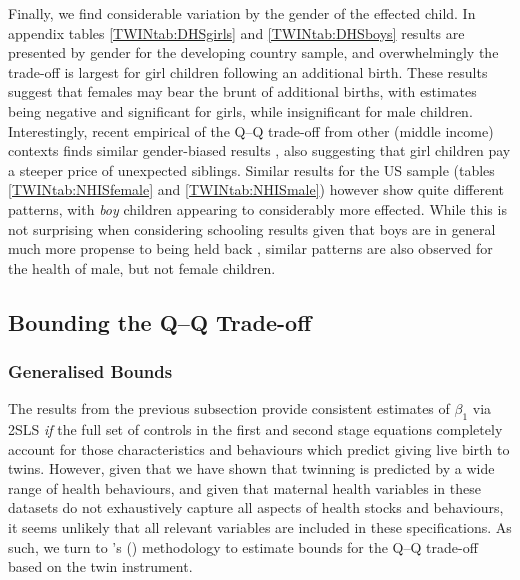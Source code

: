 \documentclass[subeqn]{article}
\begin{document}
\begin{spacing}{1.4}
Finally, we find considerable variation by the gender of the effected child.
In appendix tables \ref{TWINtab:DHSgirls} and \ref{TWINtab:DHSboys} results are
presented by gender for the developing country sample, and overwhelmingly the
trade-off is largest for girl children following an additional birth.  These
results suggest that females may bear the brunt of additional births, with
estimates being negative and significant for girls, while insignificant for male
children. Interestingly, recent empirical of the Q--Q trade-off from other (middle
income) contexts finds similar gender-biased results \citep{SouzaPonczek2012},
also suggesting that girl children pay a steeper price of unexpected siblings.
Similar results for the US sample (tables \ref{TWINtab:NHISfemale} and
\ref{TWINtab:NHISmale}) however show quite different patterns, with \emph{boy}
children appearing to considerably more effected. While this is not surprising
when considering schooling results given that boys are in general much more
propense to being held back \citet{Warrenetal2014}, similar patterns are also
observed for the health of male, but not female children.

\subsection{Bounding the Q--Q Trade-off}           \label{TWINsscn:resultBounds}
\subsubsection{Generalised Bounds}
The results from the previous subsection provide consistent estimates of 
$\beta_1$ via 2SLS \emph{if} the full set of controls in the first and second 
stage equations completely account for those characteristics and behaviours 
which predict giving live birth to twins. However, given that we have shown that 
twinning is predicted by a wide range of health behaviours, and given that 
maternal health variables in these datasets do not exhaustively capture all 
aspects of health stocks and behaviours, it seems unlikely that all relevant 
variables are included in these specifications. As such, we turn to 
\citeauthor{Conleyetal2012}'s (\citeyear{Conleyetal2012}) methodology to
estimate bounds for the Q--Q trade-off based on the twin instrument.


\end{spacing}
\end{document}
